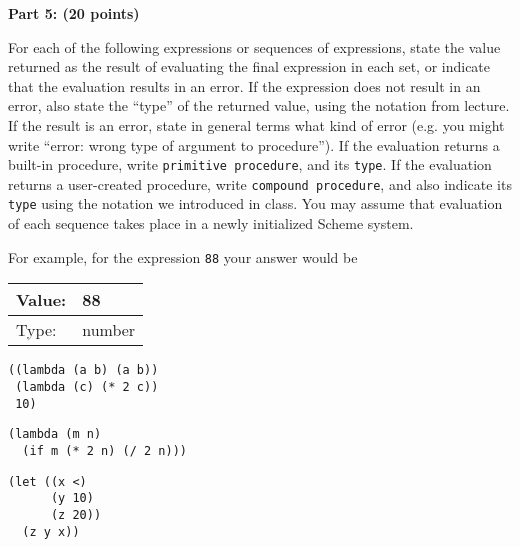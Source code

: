 
\newpage
{\bf Part 5:  (20 points)}

For each of the following expressions or sequences of expressions,
state the value returned as the result of evaluating the final
expression in each set, or indicate that the evaluation results in an
error.  If the expression does not result in an error, also state the
``type'' of the returned value, using the notation from lecture. If
the result is an error, state in general terms what kind of error
(e.g. you might write ``error: wrong type of argument to procedure'').
If the evaluation returns a built-in procedure, write {\tt primitive
procedure}, and its {\tt type}. If the evaluation returns a
user-created procedure, write {\tt compound procedure}, and also
indicate its {\tt type} using the notation we introduced in class.
You may assume that evaluation of each sequence takes place in a newly
initialized Scheme system.

For example, for the expression {\tt 88} your answer would be \\
\begin{tabular}{|l|l|}\hline
Value: & 88\\\hline
Type: & number\\\hline
\end{tabular}

\medskip
\vspace*{-0.1in}
{\small \begin{verbatim}
((lambda (a b) (a b))
 (lambda (c) (* 2 c))
 10)
\end{verbatim}}

\bigskip
\vspace*{-0.1in}
{\small \begin{verbatim}
(lambda (m n)
  (if m (* 2 n) (/ 2 n)))
\end{verbatim}}

\bigskip
\vspace*{-0.1in}
{\small \begin{verbatim} 
(let ((x <)
      (y 10)
      (z 20))
  (z y x))
\end{verbatim}}

